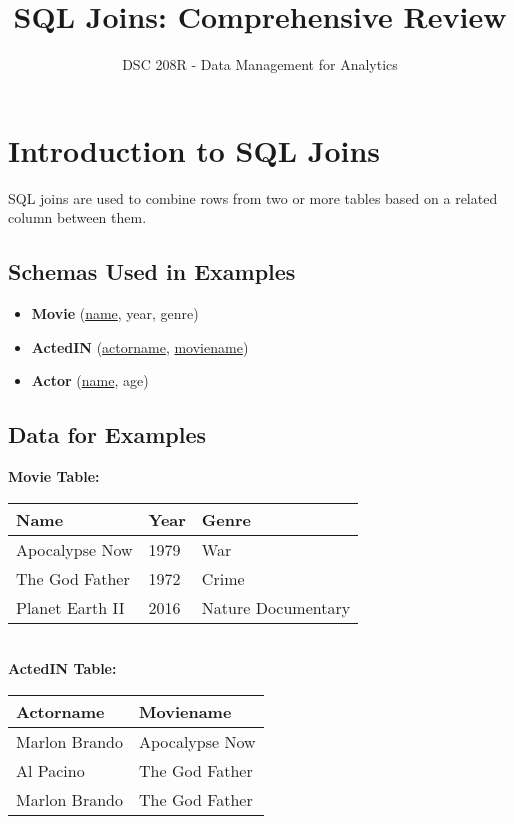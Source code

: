 \documentclass{article}
\title{SQL Joins: Comprehensive Review}
\author{DSC 208R - Data Management for Analytics}
\date{}
\begin{document}
\maketitle

\section*{Introduction to SQL Joins}
SQL joins are used to combine rows from two or more tables based on a related column between them.

\subsection*{Schemas Used in Examples}
\begin{itemize}
    \item \textbf{Movie} (\underline{name}, year, genre) 
    \item \textbf{ActedIN} (\underline{actorname}, \underline{moviename}) 
    \item \textbf{Actor} (\underline{name}, age) 
\end{itemize}

\subsection*{Data for Examples}
\textbf{Movie Table:}\\
\begin{tabular}{|l|l|l|}
    \hline
    \textbf{Name} & \textbf{Year} & \textbf{Genre} \\
    \hline
    Apocalypse Now & 1979 & War \\
    The God Father & 1972 & Crime \\
    Planet Earth II & 2016 & Nature Documentary \\
    \hline
\end{tabular}\\

\textbf{ActedIN Table:}\\ 
\begin{tabular}{|l|l|}
    \hline
    \textbf{Actorname} & \textbf{Moviename} \\
    \hline
    Marlon Brando & Apocalypse Now \\
    Al Pacino & The God Father \\
    Marlon Brando & The God Father \\
    \hline
\end{tabular}\\
\end{document}
